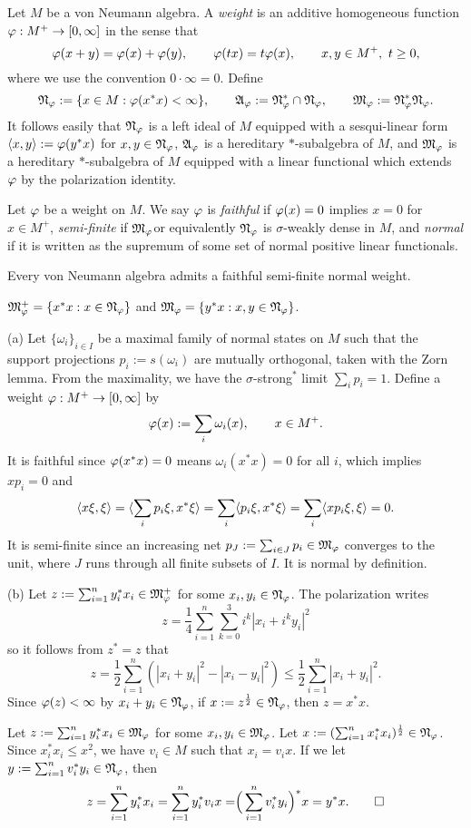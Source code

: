 \documentclass{../../large}
\begin{document}
\begin{prb}[Weights]
Let $M$ be a von Neumann algebra.
A \emph{weight} is an additive homogeneous function $\varphi:M^+\to[0,\infty]$ in the sense that
\[\varphi(x+y)=\varphi(x)+\varphi(y),\qquad\varphi(tx)=t\varphi(x),\qquad x,y\in M^+,\ t\ge0,\]
where we use the convention $0\cdot\infty=0$.
Define
\[\mathfrak{N}_\varphi:=\{x\in M:\varphi(x^*x)<\infty\},\qquad\mathfrak{A}_\varphi:=\mathfrak{N}_\varphi^*\cap\mathfrak{N}_\varphi,\qquad\mathfrak{M}_\varphi:=\mathfrak{N}_\varphi^*\mathfrak{N}_\varphi.\]
It follows easily that $\mathfrak{N}_\varphi$ is a left ideal of $M$ equipped with a sesqui-linear form $\langle x,y\rangle:=\varphi(y^*x)$ for $x,y\in\mathfrak{N}_\varphi$, $\mathfrak{A}_\varphi$ is a hereditary $*$-subalgebra of $M$, and $\mathfrak{M}_\varphi$ is a hereditary $*$-subalgebra of $M$ equipped with a linear functional which extends $\varphi$ by the polarization identity.

Let $\varphi$ be a weight on $M$.
We say $\varphi$ is \emph{faithful} if $\varphi(x)=0$ implies $x=0$ for $x\in M^+$, \emph{semi-finite} if $\mathfrak{M}_\varphi$or equivalently $\mathfrak{N}_\varphi$ is $\sigma$-weakly dense in $M$, and \emph{normal} if it is written as the supremum of some set of normal positive linear functionals.
\begin{parts}
\item Every von Neumann algebra admits a faithful semi-finite normal weight.
\item $\mathfrak{M}_\varphi^+=\{x^*x:x\in\mathfrak{N}_\varphi\}$ and $\mathfrak{M}_\varphi=\{y^*x:x,y\in\mathfrak{N}_\varphi\}$.
\end{parts}
\end{prb}
\begin{pf}
(a)
Let $\{\omega_i\}_{i\in I}$ be a maximal family of normal states on $M$ such that the support projections $p_i:=s(\omega_i)$ are mutually orthogonal, taken with the Zorn lemma.
From the maximality, we have the $\sigma$-strong$^*$ limit $\sum_ip_i=1$.
Define a weight $\varphi:M^+\to[0,\infty]$ by
\[\varphi(x):=\sum_i\omega_i(x),\qquad x\in M^+.\]
It is faithful since $\varphi(x^*x)=0$ means $\omega_i(x^*x)=0$ for all $i$, which implies $xp_i=0$ and
\[\langle x\xi,\xi\rangle=\langle\sum_ip_i\xi,x^*\xi\rangle=\sum_i\langle p_i\xi,x^*\xi\rangle=\sum_i\langle xp_i\xi,\xi\rangle=0.\]
It is semi-finite since an increasing net $p_J:=\sum_{i\in J}p_i\in\mathfrak{M}_\varphi$ converges to the unit, where $J$ runs through all finite subsets of $I$.
It is normal by definition.

(b)
Let $z:=\sum_{i=1}^ny_i^*x_i\in\mathfrak{M}_\varphi^+$ for some $x_i,y_i\in\mathfrak{N}_\varphi$.
The polarization writes
\[z=\frac14\sum_{i=1}^n\sum_{k=0}^3i^k|x_i+i^ky_i|^2\]
so it follows from $z^*=z$ that
\[z=\frac12\sum_{i=1}^n(|x_i+y_i|^2-|x_i-y_i|^2)\le\frac12\sum_{i=1}^n|x_i+y_i|^2.\]
Since $\varphi(z)<\infty$ by $x_i+y_i\in\mathfrak{N}_\varphi$, if $x:=z^{\frac12}\in\mathfrak{N}_\varphi$, then $z=x^*x$.

Let $z:=\sum_{i=1}^ny_i^*x_i\in\mathfrak{M}_\varphi$ for some $x_i,y_i\in\mathfrak{M}_\varphi$.
Let $x:=(\sum_{i=1}^nx_i^*x_i)^{\frac12}\in\mathfrak{N}_\varphi$.
Since $x_i^*x_i\le x^2$, we have $v_i\in M$ such that $x_i=v_ix$.
If we let $y:=\sum_{i=1}^nv_i^*y_i\in\mathfrak{N}_\varphi$, then
\[z=\sum_{i=1}^ny_i^*x_i=\sum_{i=1}^ny_i^*v_ix=\Bigr(\sum_{i=1}^nv_i^*y_i\Bigr)^*x=y^*x.\qedhere\]
\end{pf}
\end{document}
